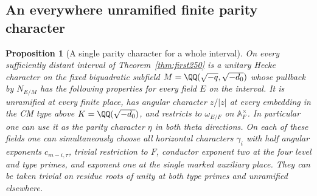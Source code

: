 \documentclass[a4paper,11pt]{article}
\newtheorem{proposition}{Proposition}[section]
\theoremstyle{definition}
\theoremstyle{remark}
\numberwithin{equation}{section}
\begin{document}
\subsection{An everywhere unramified finite parity character}\label{nav:VIII-40}
\begin{proposition}[A single parity character for a whole interval]\leavevmode
\label{prop:parity262}
On every sufficiently distant interval of Theorem~\ref{thm:first250} is a unitary Hecke character on the fixed biquadratic subfield
\(M=\QQ(\sqrt{-q},\sqrt{-d_0})\) whose pullback by \(N_{E/M}\)
has the following properties for every field \(E\) on the interval.
It is unramified at every finite place, has angular character
\(z/|z|\) at every embedding in the CM type above
\(K=\QQ(\sqrt{-d_0})\), and restricts to \(\omega_{E/F}\) on
\(\mathbb A_F^\times\). In particular one can use it as the parity
character \(\eta\) in both theta directions. On each of these
fields one can simultaneously choose all horizontal characters
\(\gamma_i\) with half angular exponents \(c_{m-i,\tau}\),
trivial restriction to \(F\), conductor exponent two at the
four level and type primes, and exponent one at the single
marked auxiliary place. They can be taken trivial on residue
roots of unity at both type primes and unramified elsewhere.
\end{proposition}
\end{document}
